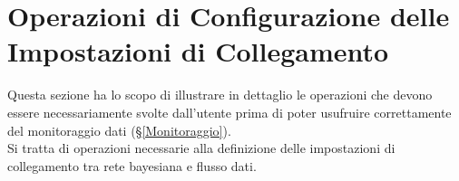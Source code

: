 \section{Operazioni di Configurazione delle Impostazioni di Collegamento}\label{PreMonitoraggio}
Questa sezione ha lo scopo di illustrare in dettaglio le operazioni che devono essere necessariamente svolte dall'utente prima di poter usufruire correttamente del monitoraggio dati (§\ref{Monitoraggio}).\\
Si tratta di operazioni necessarie alla definizione delle impostazioni di collegamento tra rete bayesiana e flusso dati.




\pagebreak



\pagebreak



\pagebreak



\pagebreak



\pagebreak



\pagebreak